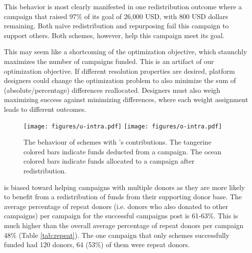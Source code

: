 This behavior is most clearly manifested in one redistribution outcome where a campaign that raised 97\% of its goal of 26,000 USD, with 800 USD dollars remaining. Both na\"ive redistribution and repurposing fail this campaign to support others. Both \cpr schemes, however, help this campaign meet its goal.

This may seem like a shortcoming of the optimization objective, which staunchly maximizes the number of campaigns funded. This is an artifact of our optimization objective. If different resolution properties are desired, platform designers could change the optimization problem to also minimize the sum of (absolute/percentage) differences reallocated. Designers must also weigh maximizing success against minimizing differences, where each weight assignment leads to different outcomes.


\begin{figure*}[htbp]
    \centering
    \texttt{[image: figures/u-intra.pdf]}
    \texttt{[image: figures/o-intra.pdf]}
    \caption{The behaviour of \cpr schemes with \lag's contributions. The {\color{tangerine} tangerine} colored bars indicate funds deducted 
    from a campaign. The {\color{ocean} ocean} colored bars indicate funds allocated to a campaign after redistribution.}
    \label{fig:intra}
\end{figure*}

\Cpr is biased toward helping campaigns with multiple donors as they are more likely to benefit from a redistribution of funds from their supporting donor base. The average percentage of repeat donors (i.e. donors who also donated to other campaigns) per campaign for the successful campaigns post \cpr is 61-63\%. This is much higher than the overall average percentage of repeat donors per campaign 48\% (Table \ref{tab:repeat}). The one campaign that only \cpr schemes successfully funded had 120 donors, 64 (53\%) of them were repeat donors.

